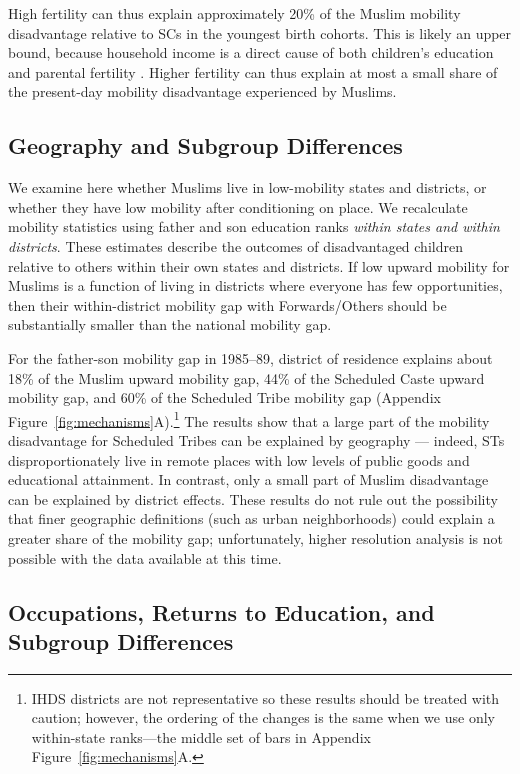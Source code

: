 \documentclass[12pt,letterpaper]{article}
\numberwithin{equation}{section}
\begin{document}
High fertility can thus explain approximately 20\% of the Muslim mobility disadvantage relative to SCs in the youngest birth cohorts. This is likely an upper bound, because household income is a direct cause of both children's education and parental fertility \cite{schultz2003}. Higher fertility can thus explain at most a small share of the present-day mobility disadvantage experienced by Muslims.

\subsection{Geography and Subgroup Differences}

We examine here whether Muslims live in low-mobility states and districts, or whether they have low mobility after conditioning on place. We recalculate mobility statistics using father and son education ranks \textit{within states and within districts}. These estimates describe the outcomes of disadvantaged children relative to others within their own states and districts. If low upward mobility for Muslims is a function of living in districts where everyone has few opportunities, then their within-district mobility gap with Forwards/Others should be substantially smaller than the national mobility gap.

For the father-son mobility gap in 1985--89, district of residence explains about 18\% of the Muslim upward mobility gap, 44\% of the Scheduled Caste upward mobility gap, and 60\% of the Scheduled Tribe mobility gap (Appendix Figure~\ref{fig:mechanisms}A).\footnote{IHDS districts are not representative so these results should be treated with caution; however, the ordering of the changes is the same when we use only within-state ranks---the middle set of bars in Appendix Figure~\ref{fig:mechanisms}A.} The results show that a large part of the mobility disadvantage for Scheduled Tribes can be explained by geography --- indeed, STs disproportionately live in remote places with low levels of public goods and educational attainment. In contrast, only a small part of Muslim disadvantage can be explained by district effects. These results do not rule out the possibility that finer geographic definitions (such as urban neighborhoods) could explain a greater share of the mobility gap; unfortunately, higher resolution analysis is not possible with the data available at this time.

\subsection{Occupations, Returns to Education, and Subgroup Differences}
\end{document}
